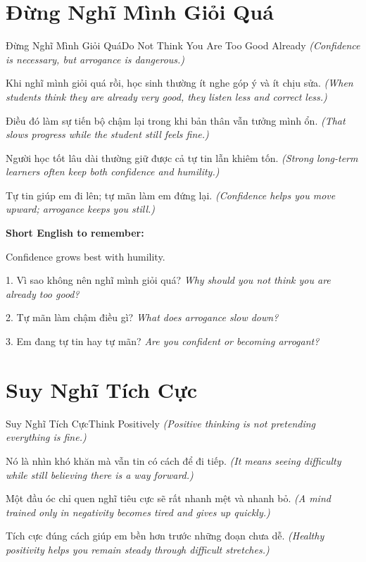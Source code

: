 \section{Đừng Nghĩ Mình Giỏi Quá}
\begin{truyen}{Đừng Nghĩ Mình Giỏi Quá}{Do Not Think You Are Too Good Already}
\textit{(Confidence is necessary, but arrogance is dangerous.)}

Khi nghĩ mình giỏi quá rồi, học sinh thường ít nghe góp ý và ít chịu sửa.
\textit{(When students think they are already very good, they listen less and correct less.)}

Điều đó làm sự tiến bộ chậm lại trong khi bản thân vẫn tưởng mình ổn.
\textit{(That slows progress while the student still feels fine.)}

Người học tốt lâu dài thường giữ được cả tự tin lẫn khiêm tốn.
\textit{(Strong long-term learners often keep both confidence and humility.)}
\end{truyen}

\begin{baihoc}
Tự tin giúp em đi lên; tự mãn làm em đứng lại.
\textit{(Confidence helps you move upward; arrogance keeps you still.)}
\end{baihoc}

\begin{ghinhoanh}
\textbf{Short English to remember:}

Confidence grows best with humility.

\end{ghinhoanh}

\begin{tuhocnhanh}
1. Vì sao không nên nghĩ mình giỏi quá? \textit{Why should you not think you are already too good?}

2. Tự mãn làm chậm điều gì? \textit{What does arrogance slow down?}

3. Em đang tự tin hay tự mãn? \textit{Are you confident or becoming arrogant?}
\end{tuhocnhanh}
\ngancach

\section{Suy Nghĩ Tích Cực}
\begin{truyen}{Suy Nghĩ Tích Cực}{Think Positively}
\textit{(Positive thinking is not pretending everything is fine.)}

Nó là nhìn khó khăn mà vẫn tin có cách để đi tiếp.
\textit{(It means seeing difficulty while still believing there is a way forward.)}

Một đầu óc chỉ quen nghĩ tiêu cực sẽ rất nhanh mệt và nhanh bỏ.
\textit{(A mind trained only in negativity becomes tired and gives up quickly.)}

Tích cực đúng cách giúp em bền hơn trước những đoạn chưa dễ.
\textit{(Healthy positivity helps you remain steady through difficult stretches.)}
\end{truyen}

